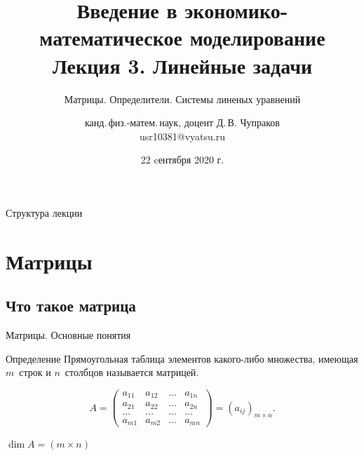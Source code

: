 \documentclass[unicode,11pt,notheorems]{beamer}
\author[Д.\,В. Чупраков]{канд.\,физ.-матем.\,наук, доцент Д.\,В. Чупраков\\[6pt] usr10381@vyatsu.ru}
\institute[ВятГУ]{ФГБОУ ВО Вятский государственный университет}
\title[Лекция~3. Линейные задачи. Часть~1 из 4]{
	Введение в экономико-математическое моделирование\\[12pt]
	Лекция 3. Линейные задачи}
\subtitle{Матрицы. Определители. Системы линеных уравнений}
\date{22 cентября 2020 г.}
\begin{document}
\maketitle

\begin{frame}{Структура лекции}
	\tableofcontents
\end{frame}



\section{Матрицы}
\subsection{Что такое матрица}
\begin{frame}{Матрицы. Основные понятия}
	\begin{block}{Определение}
		Прямоугольная таблица элементов какого-либо множества, имеющая $m$~строк и $n$~столбцов называется \alert{матрицей}.
	\end{block}

	\bigskip
	$$
	A = \begin{pmatrix}
				a_{11} & a_{12} & \ldots & a_{1n} \\
				a_{21} & a_{22} & \ldots & a_{2n} \\
				\ldots & \ldots & \ldots &\ldots \\
				a_{m1} & a_{m2} & \ldots & a_{mn}
			\end{pmatrix} = (a_{ij})_{m \times n}.
	$$

	\bigskip
	 $\dim A = (m\times n)$
\end{frame}
\end{document}
